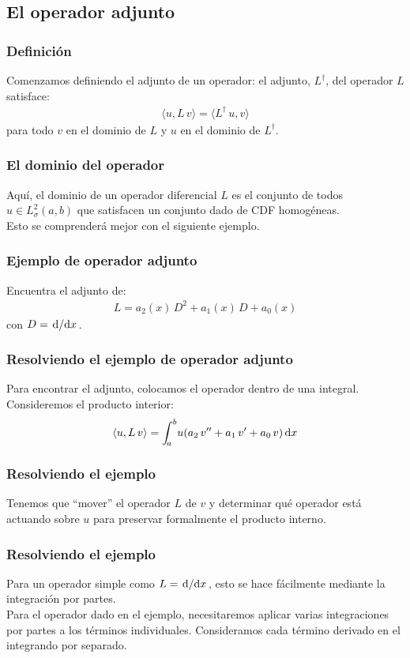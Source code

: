 \documentclass[12pt]{beamer}
\begin{document}
\subsection{El operador adjunto}

\begin{frame}
\frametitle{Definición}
Comenzamos definiendo el adjunto de un operador: \pause el adjunto, $L^{\dagger}$, del operador $L$ satisface:
\begin{align*}
\langle u, L \, v \rangle = \langle L^{\dagger} \, u,  v \rangle
\end{align*}
para todo $v$ en el dominio de $L$ y $u$ en el dominio de $L^{\dagger}$.
\end{frame}
\begin{frame}
\frametitle{El dominio del operador}
Aquí, el dominio de un operador diferencial $L$ es el conjunto de todos $u \in L_{\sigma}^{2} (a, b)$ que satisfacen un conjunto dado de CDF homogéneas.
\\
\bigskip
\pause
Esto se comprenderá mejor con el siguiente ejemplo.
\end{frame}
\begin{frame}
\frametitle{Ejemplo de operador adjunto}
Encuentra el adjunto de:
\begin{align*}
L = a_{2}(x) \, D^{2} + a_{1}(x) \, D + a_{0}(x)
\end{align*}
con $D = \dv*{x}$.
\end{frame}
\begin{frame}
\frametitle{Resolviendo el ejemplo de operador adjunto}    
Para encontrar el adjunto, colocamos el operador dentro de una integral. 
\\
\bigskip
\pause
Consideremos el producto interior:
\begin{align*}
\langle u , L \, v \rangle = \scaleint{5ex}_{\bs a}^{b} u (a_{2} \, \sderivada{v} + a_{1} \, \pderivada{v} + a_{0} \, v) \dd{x}
\end{align*}
\end{frame}
\begin{frame}
\frametitle{Resolviendo el ejemplo}
Tenemos que \enquote{mover} el operador $L$ de $v$ \pause y determinar qué operador está actuando sobre $u$ para preservar formalmente el producto interno.
\\
\bigskip
\pause
\end{frame}
\begin{frame}
\frametitle{Resolviendo el ejemplo}    
Para un operador simple como $L = \dv*{x}$, esto se hace fácilmente mediante la integración por partes.
\\
\bigskip
\pause
Para el operador dado en el ejemplo, necesitaremos aplicar varias integraciones por partes a los términos individuales. Consideramos cada término derivado en el integrando por separado.
\end{frame}
\end{document}
